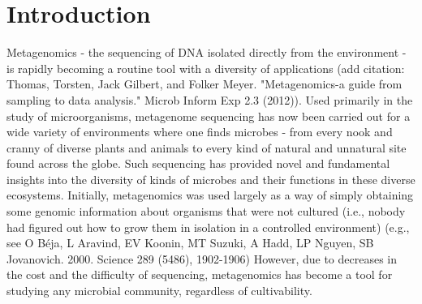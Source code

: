 \documentclass[10pt]{article}
\begin{document}

\clearpage

\section*{Introduction}

Metagenomics - the sequencing of DNA isolated directly from the environment - is rapidly becoming a routine tool with a diversity of applications (add citation: Thomas, Torsten, Jack Gilbert, and Folker Meyer. "Metagenomics-a guide from sampling to data analysis." Microb Inform Exp 2.3 (2012)). Used primarily in the study of microorganisms, metagenome sequencing has now been carried out for a wide variety of environments where one finds microbes - from every nook and cranny of diverse plants and animals to every kind of natural and unnatural site found across the globe.
Such sequencing has provided novel and fundamental insights into the diversity of kinds of microbes and their functions in these diverse ecosystems.
Initially, metagenomics was used largely as a way of simply obtaining some genomic information about organisms that were not cultured (i.e., nobody had figured out how to grow them in isolation in a controlled environment) (e.g., see O Béja, L Aravind, EV Koonin, MT Suzuki, A Hadd, LP Nguyen, SB Jovanovich. 2000. Science 289 (5486), 1902-1906)
However, due to decreases in the cost and the difficulty of sequencing, metagenomics has become a tool for studying any microbial community, regardless of cultivability.
\end{document}
